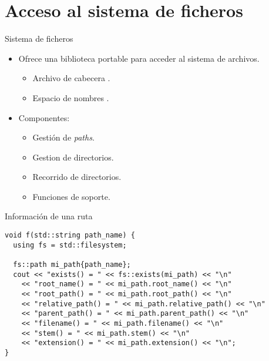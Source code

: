 \section{Acceso al sistema de ficheros}

\begin{frame}[t]{Sistema de ficheros}
\begin{itemize}
  \item Ofrece una biblioteca portable para acceder al sistema de archivos.
    \begin{itemize}
      \item Archivo de cabecera .
      \item Espacio de nombres .
    \end{itemize}
 
  \vfill\pause
  \item Componentes:
    \begin{itemize}
      \item Gestión de \emph{paths}.
      \item Gestion de directorios.
      \item Recorrido de directorios.
      \item Funciones de soporte.
    \end{itemize}
\end{itemize}
\end{frame}

\begin{frame}[t,fragile]{Información de una ruta}
\begin{lstlisting}
void f(std::string path_name) {
  using fs = std::filesystem;

  fs::path mi_path{path_name};
  cout << "exists() = " << fs::exists(mi_path) << "\n"
    << "root_name() = " << mi_path.root_name() << "\n"
    << "root_path() = " << mi_path.root_path() << "\n"
    << "relative_path() = " << mi_path.relative_path() << "\n"
    << "parent_path() = " << mi_path.parent_path() << "\n"
    << "filename() = " << mi_path.filename() << "\n"
    << "stem() = " << mi_path.stem() << "\n"
    << "extension() = " << mi_path.extension() << "\n";
}
\end{lstlisting}
\end{frame}

